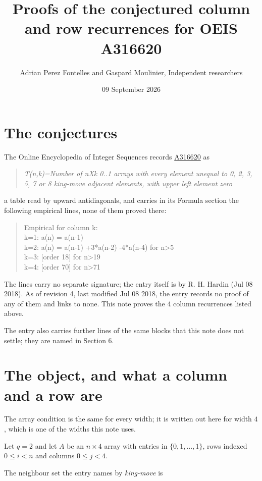 \documentclass[11pt]{article}
\title{Proofs of the conjectured column and row recurrences for OEIS A316620}
\author{Adrian Perez Fontelles and Gaspard Moulinier, Independent researchers}
\date{09 September 2026}
\theoremstyle{definition}
\begin{document}
\maketitle
\section{The conjectures}

The Online Encyclopedia of Integer Sequences records \href{https://oeis.org/A316620}{A316620} as

\begin{quote}\itshape T(n,k)=Number of nXk 0..1 arrays with every element unequal to 0, 2, 3, 5, 7 or 8 king-move adjacent elements, with upper left element zero\end{quote}

a table read by upward antidiagonals, and carries in its Formula section the following empirical lines, none of them proved there:

\begin{quote}\ttfamily Empirical for column k:\\
k=1: a(n) = a(n-1)\\k=2: a(n) = a(n-1) +3*a(n-2) -4*a(n-4) for n>5\\k=3: [order 18] for n>19\\k=4: [order 70] for n>71\end{quote}

The lines carry no separate signature; the entry itself is by R. H. Hardin (Jul 08 2018). As of revision 4, last modified Jul 08 2018, the entry records no proof of any of them and links to none. This note proves the 4 column recurrences listed above.

The entry also carries further lines of the same blocks that this note does not settle; they are named in Section 6.

\section{The object, and what a column and a row are}

The array condition is the same for every width; it is written out here for width $4$, which is one of the widths this note uses.

Let $q = 2$ and let $A$ be an $n \times 4$ array with entries in $\{0,1,\dots,1\}$, rows indexed $0 \le i < n$ and columns $0 \le j < 4$.

The neighbour set the entry names by {\itshape king-move} is
\end{document}

